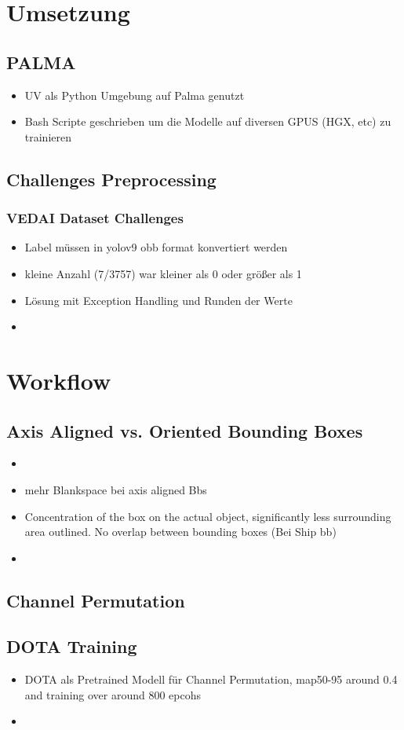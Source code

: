 \section{Umsetzung}
\subsection{PALMA}
\begin{itemize}
    \item UV als Python Umgebung auf Palma genutzt
    \item Bash Scripte geschrieben um die Modelle auf diversen GPUS (HGX, etc) zu trainieren
\end{itemize}

\subsection{Challenges Preprocessing}
\subsubsection{VEDAI Dataset Challenges}
\begin{itemize}
    \item Label müssen in yolov9 obb format konvertiert werden
    \item kleine Anzahl (7/3757) war kleiner als 0 oder größer als 1
    \item Lösung mit Exception Handling und Runden der Werte
    \item {}
\end{itemize}

\section{Workflow}
\subsection{Axis Aligned vs. Oriented Bounding Boxes}
\begin{itemize}
    \item {}
    \item mehr Blankspace bei axis aligned Bbs
    \item Concentration of the box on the actual object, significantly less surrounding area outlined. No overlap between bounding boxes (Bei Ship bb)
    \item 
\end{itemize}
\subsection{Channel Permutation}
\subsection{DOTA Training}
\begin{itemize}
    \item DOTA als Pretrained Modell für Channel Permutation, map50-95 around 0.4 and training over around 800 epcohs 
    \item {}
\end{itemize}
\else
\blindtext
\fi

